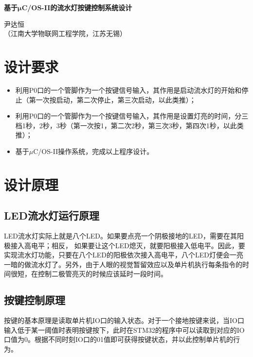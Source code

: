 \documentclass[a4paper]{ctexart}
\begin{document}

\begin{spacing}{1}
\tableofcontents
\end{spacing}
\newpage

\begin{center}
	{\textbf{基于$\bm\mu$C/OS-II的流水灯按键控制系统设计}}

	{尹达恒}\\[-1mm]

	{（江南大学物联网工程学院，江苏\quad 无锡）}
\end{center}
\begin{spacing}{1.3}
	\songti{}
	\section{设计要求}
	\begin{itemize}
		\item 利用P0口的一个管脚作为一个按键信号输入，其作用是启动流水灯的开始和停止（第一次按启动，第二次停止，第三次启动，以此类推）；
		\item 利用P0口的一个管脚作为一个按键信号输入，其作用是设置灯亮的时间，分三档1秒，2秒，3秒（第一次按1，第二次2秒，第三次3秒，第四次1秒，以此类推）；
		\item 基于$\mu$C/OS-II操作系统，完成以上程序设计。
	\end{itemize}

	\section{设计原理}
	\subsection{LED流水灯运行原理}
	LED流水灯实际上就是八个LED。如果要点亮一个阴极接地的LED，需要在其阳极接入高电平；相反， 如果要让这个LED熄灭，就要阳极接入低电平。因此，要实现流水灯功能，只要在八个LED的阳极依次接入高电平，八个LED灯便会一亮一暗的做流水灯了。另外，由于人眼的视觉暂留效应以及单片机执行每条指令的时间很短，在控制二极管亮灭的时候应该延时一段时间。

	\subsection{按键控制原理}
	按键的基本原理是读取单片机IO口的输入状态。对于一个接地按键来说，当IO口输入低于某一阈值时表明按键按下，此时在STM32的程序中可以读取到对应的IO口值为0。根据不同时刻IO口的01值即可获得按键状态，并以此控制单片机的行为。
	

\end{spacing}
\end{document}
